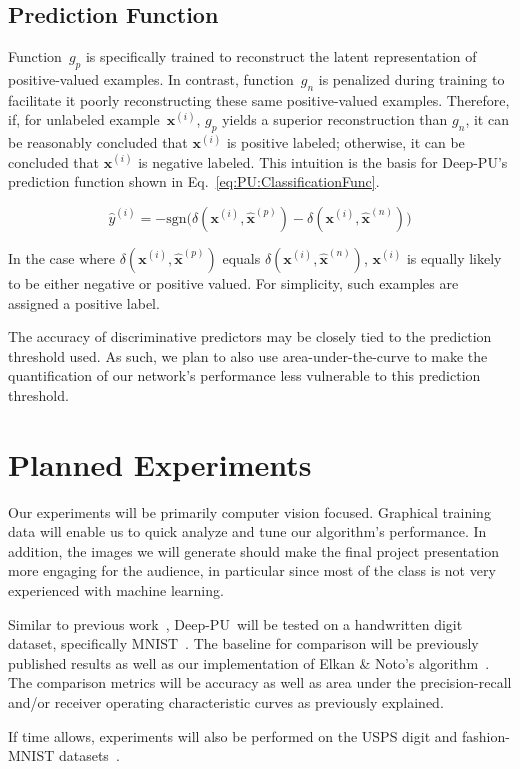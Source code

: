 \documentclass[10pt]{article}
\newcommand{\sign}[1]{\text{sgn}\bigg( #1 \bigg) }
\newcommand{\toolname}{Deep-PU}
\newcommand{\xI}[1]{\mathbf{x}^{(#1)}}
\newcommand{\xPred}[1]{\mathbf{\hat{x}}^{\left(#1\right)}}
\newcommand{\xP}{\xPred{p}}
\newcommand{\xN}{\xPred{n}}
\newcommand{\puDist}[2]{\delta\left(#1, #2\right)}
\newcommand{\puDistDiff}{\puDist{\xI{i}}{\xP} - \puDist{\xI{i}}{\xN}}
\begin{document}
\subsection{Prediction Function}

Function~$g_{p}$ is specifically trained to reconstruct the latent representation of positive-valued examples.  In contrast, function~$g_{n}$ is penalized during training to facilitate it poorly reconstructing these same positive-valued examples.  Therefore, if, for unlabeled example~$\xI{i}$, $g_{p}$ yields a superior reconstruction than $g_{n}$, it can be reasonably concluded that $\xI{i}$ is positive labeled; otherwise, it can be concluded that $\xI{i}$ is negative labeled.  This intuition is the basis for \toolname's prediction function shown in Eq.~\eqref{eq:PU:ClassificationFunc}.

  \begin{equation}\label{eq:PU:ClassificationFunc}
    \hat{y}^{\left( i \right)} = -\sign{\puDistDiff}
  \end{equation}

  In the case where $\puDist{\xI{i}}{\xP}$ equals $\puDist{\xI{i}}{\xN}$, $\xI{i}$ is equally likely to be either negative or positive valued.  For simplicity, such examples are assigned a positive label. %

  The accuracy of discriminative predictors may be closely tied to the prediction threshold used.  As such, we plan to also use area-under-the-curve to make the quantification of our network's performance less vulnerable to this prediction threshold.

\section{Planned Experiments}

Our experiments will be primarily computer vision focused. Graphical training data will enable us to quick analyze and tune our algorithm's performance.  In addition, the images we will generate should make the final project presentation more engaging for the audience, in particular since most of the class is not very experienced with machine learning.

Similar to previous work~\cite{Ghasemi:2016,duPlessis:2014,Claesen:2015}, \toolname\ will be tested on a handwritten digit dataset, specifically MNIST~\cite{LeCun:1999}.  The baseline for comparison will be previously published results as well as our implementation of Elkan \& Noto's algorithm~\cite{Elkan:2008}.  The comparison metrics will be accuracy as well as area under the precision-recall and/or receiver operating characteristic curves as previously explained.

If time allows, experiments will also be performed on the USPS digit and fashion-MNIST  datasets~\cite{FashionMNIST}.



\end{document}
